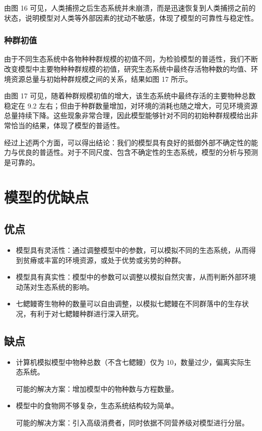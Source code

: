 \documentclass[11pt,a4paper]{ctexart}
\begin{document}
由图 16 可见，人类捕捞之后生态系统并未崩溃，而是迅速恢复到人类捕捞之前的状态，说明模型对人类等外部因素的扰动不敏感，体现了模型的可靠性与稳定性。

\subsubsection{种群初值}

由于不同生态系统中各物种种群规模的初值不同，为检验模型的普适性，我们不断改变模型中主要物种种群规模的初值，研究生态系统中最终存活物种数的均值、环境资源总量与初始种群规模之间的关系，结果如图 17 所示。

由图 17 可见，随着种群规模初值的增大，该生态系统中最终存活的主要物种总数稳定在 9.2 左右；但由于种群数量增加，对环境的消耗也随之增大，可见环境资源总量持续下降。这些现象非常合理，因此模型能够针对不同的初始种群规模给出非常恰当的结果，体现了模型的普适性。

经过上述两个方面，可以得出结论：我们的模型具有良好的抵御外部不确定性的能力与优良的普适性。对于不同尺度、包含不确定性的生态系统，模型的分析与预测是可靠的。

\section{模型的优缺点}

\subsection{优点}

\begin{itemize}
\item 模型具有灵活性：通过调整模型中的参数，可以模拟不同的生态系统，从而得到贫瘠或丰富的环境资源，或处于优势或劣势的种群。
\item 模型具有真实性：模型中的参数可以调整以模拟自然灾害，从而判断外部环境动荡对生态系统的影响。
\item 七鳃鳗寄生物种的数量可以自由调整，以模拟七鳃鳗在不同群落中的生存状况，有利于对七鳃鳗种群进行深入研究。
\end{itemize}

\subsection{缺点}

\begin{itemize}
\item 计算机模拟模型中物种总数（不含七鳃鳗）仅为 10，数量过少，偏离实际生态系统。

可能的解决方案：增加模型中的物种数与方程数量。

\item 模型中的食物网不够复杂，生态系统结构较为简单。

可能的解决方案：引入高级消费者，同时依据不同营养级对模型进行分层。
\end{itemize}
\end{document}
